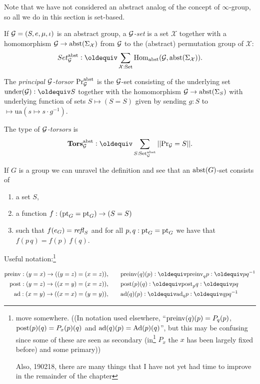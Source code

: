 Note that we have not considered an abstract analog of the concept of $\infty$-group, so all we do in this section is set-based.

\begin{definition}
\label{def:abstrGtorsors}
  If ${\mathcal G}=(S,e,\mu,\iota)$ is an abstract group, a \emph{$\mathcal G$-set} is a set $\mathcal X$ together with a homomorphism
$\mathcal G\to\mathrm{abst}(\Sigma_{\mathcal X})$
from $\mathcal G$ to the (abstract) permutation group of $\mathcal X$:
$$Set_{\agp G}^\abstr\defequi \sum_{\mathcal X:\Set}\Hom_\abstr({\agp G},\abstr(\Sigma_{\mathcal X})).$$

The \emph{principal ${\mathcal G}$-torsor} $\mathrm{Pr}_{{\mathcal G}}^{\mathrm{abst}}$ is the ${\mathcal G}$-set consisting of the underlying set $\mathrm{under}({\agp G})\defequi S$ together with the homomorphism ${\mathcal G}\to\mathrm{abst}(\Sigma_{S})$ with underlying function of sets $S\mapsto (S=S)$ given by sending $g:S$ to $\mapsto \mathrm{ua}(s\mapsto s\cdot g^{-1})$.

The type of \emph{${\mathcal G}$-torsors} is
$$\typetorsor_{\agp G}^\abstr\defequi\sum_{S:\Set_{\agp G}^\abstr}||\princ {\agp G}=S||.$$
\end{definition}
\begin{example}
  If $G$ is a group we can unravel the definition and see that an $\mathrm{abst}(G)$-set consists of
  \begin{enumerate}
  \item a set $S$, 
  \item a function $f:({\mathord{\mathrm{pt}}}_G={\mathord{\mathrm{pt}}}_G)\to (S=S)$ 
  \item such that $f(e_G)=\mathop{{\it refl}_{S}}$ and for all $p,q:{\mathord{\mathrm{pt}}}_G={\mathord{\mathrm{pt}}}_G$ we have that $f(p\, q)=f(p)\,f(q)$.
  \end{enumerate}

\end{example}


Useful notation:\footnote{move somewhere. ((In notation used elsewhere, ``$\mathrm{preinv}(q)(p)=P_q(p)$, $\mathrm{post}(p)(q)=P_x(p)(q)$ and $\mathrm{ad}(q)(p)=\mathrm{Ad}(p)(q)$'', but this may be confusing since some of these are seen as secondary (\eg in\footnote{why doesn't xspace work?} $P_x$ the $x$ has been largely fixed before) and some primary))

Also, 190218, there are many things that I have not yet had time to improve in the remainder of the chapter}

\begin{align*}
  \preinv:(y=x)\to ((y=z)=(x=z)),\qquad&\preinv(q)(p)\defequi\preinv_qp\defequi pq^{-1}\\
  \post:(y=z)\to ((x=y)=(x=z)),\qquad&\post(p)(q)\defequi\post_pq\defequi pq\\
  \adjoint:(x=y)\to((x=x)=(y=y)),\qquad&\adjoint(q)(p)\defequi\adjoint_qp\defequi qpq^{-1}
\end{align*}


